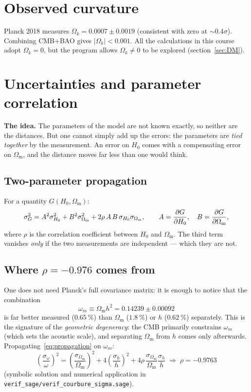 \documentclass[11pt,a4paper,openany]{report}
\newcommand{\Hzero}{H_{0}}
\newcommand{\Om}{\Omega_{\mathrm{m}}}
\newcommand{\Ok}{\Omega_{k}}
\begin{document}
\section{Observed curvature}
\label{sec:Ok}

Planck 2018 measures $\Ok = 0.0007 \pm 0.0019$ (consistent with zero at
$\sim 0.4\sigma$). Combining CMB+BAO gives $|\Ok| < 0.001$. All the
calculations in this course adopt $\Ok = 0$, but the program allows
$\Ok \neq 0$ to be explored (section~\ref{sec:DM}).

\section{Uncertainties and parameter correlation}
\label{sec:uncertainties}

\begin{tcolorbox}[plain]
\textbf{The idea.} The parameters of the model are not known exactly, so
neither are the distances. But one cannot simply add up the errors: the
parameters are \emph{tied together} by the measurement. An error on $\Hzero$
comes with a compensating error on $\Om$, and the distance moves far less than
one would think.
\end{tcolorbox}

\subsection{Two-parameter propagation}

\begin{tcolorbox}[undergrad]
For a quantity $G(\Hzero, \Om)$:
\begin{equation}
\sigma_G^{2} = A^{2}\sigma_{\Hzero}^{2} + B^{2}\sigma_{\Om}^{2}
             + 2\rho\,A\,B\,\sigma_{\Hzero}\sigma_{\Om},
\qquad A = \pdv{G}{\Hzero},\quad B = \pdv{G}{\Om},
\label{eq:propagation}
\end{equation}
where $\rho$ is the correlation coefficient between $\Hzero$ and $\Om$. The
third term vanishes \emph{only} if the two measurements are independent ---
which they are not.
\end{tcolorbox}

\subsection{Where $\rho = -0.976$ comes from}

One does not need Planck's full covariance matrix: it is enough to notice that
the combination
\[
\omega_{m} \equiv \Om h^{2} = 0.14239 \pm 0.00092
\]
is far better measured ($0.65~\%$) than $\Om$ ($1.8~\%$) or $h$ ($0.62~\%$)
separately. This is the signature of the \emph{geometric degeneracy}: the CMB
primarily constrains $\omega_m$ (which sets the acoustic scale), and separating
$\Om$ from $h$ comes only afterwards. Propagating~\eqref{eq:propagation} on
$\omega_m$:
\[
\left(\frac{\sigma_{\omega}}{\omega}\right)^{2}
 = \left(\frac{\sigma_{\Om}}{\Om}\right)^{2}
 + 4\left(\frac{\sigma_{h}}{h}\right)^{2}
 + 4\rho\,\frac{\sigma_{\Om}}{\Om}\frac{\sigma_{h}}{h}
\;\Longrightarrow\;
\boxed{\rho = -0.9763}
\]
(symbolic solution and numerical application in
\texttt{verif\_sage/verif\_courbure\_sigma.sage}).
\end{document}
